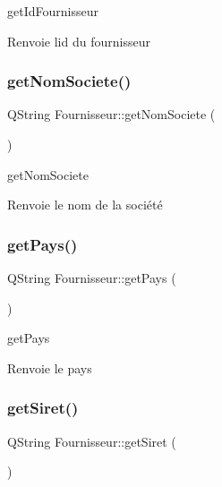 get\+Id\+Fournisseur 

\begin{DoxyReturn}{Renvoie}
l\textquotesingle{}id du fournisseur 
\end{DoxyReturn}
\mbox{\label{class_fournisseur_ae83d27670f38c39d2ea4a3979e87c979}} 
\subsubsection{\texorpdfstring{get\+Nom\+Societe()}{getNomSociete()}}
{\footnotesize\ttfamily Q\+String Fournisseur\+::get\+Nom\+Societe (\begin{DoxyParamCaption}{ }\end{DoxyParamCaption})}



get\+Nom\+Societe 

\begin{DoxyReturn}{Renvoie}
le nom de la société 
\end{DoxyReturn}
\mbox{\label{class_fournisseur_a5004e3d9666618fce013b58ef93b0560}} 
\subsubsection{\texorpdfstring{get\+Pays()}{getPays()}}
{\footnotesize\ttfamily Q\+String Fournisseur\+::get\+Pays (\begin{DoxyParamCaption}{ }\end{DoxyParamCaption})}



get\+Pays 

\begin{DoxyReturn}{Renvoie}
le pays 
\end{DoxyReturn}
\mbox{\label{class_fournisseur_a4194cdab5ed4dbcf97ac63369fa2be8d}} 
\subsubsection{\texorpdfstring{get\+Siret()}{getSiret()}}
{\footnotesize\ttfamily Q\+String Fournisseur\+::get\+Siret (\begin{DoxyParamCaption}{ }\end{DoxyParamCaption})}



